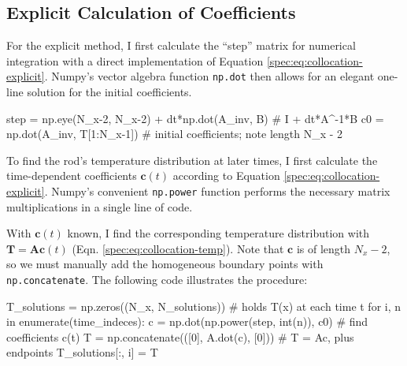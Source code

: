 \documentclass[11pt, a4paper]{article}
\newcommand{\mat}[1]{\mathbf{#1}}
\begin{document}
\subsection{Explicit Calculation of Coefficients}
For the explicit method, I first calculate the ``step'' matrix for numerical integration with a direct implementation of Equation \ref{spec:eq:collocation-explicit}. Numpy's vector algebra function \texttt{np.dot} then allows for an elegant one-line solution for the initial coefficients.
\begin{python}
step = np.eye(N_x-2, N_x-2) + dt*np.dot(A_inv, B)  # I + dt*A^{-1}*B
c0 = np.dot(A_inv, T[1:N_x-1])  # initial coefficients; note length N_x - 2
\end{python}
To find the rod's temperature distribution at later times, I first calculate the time-dependent coefficients $ \bm{c}(t) $ according to Equation \ref{spec:eq:collocation-explicit}. Numpy's convenient \texttt{np.power} function performs the necessary matrix multiplications in a single line of code. 

With $ \bm{c}(t) $ known, I find the corresponding temperature distribution with $ \bm{T} = \mat{A}\bm{c}(t) $ (Eqn. \ref{spec:eq:collocation-temp}). Note that $ \bm{c} $ is of length $ N_{x} -2 $, so we must manually add the homogeneous boundary points with \texttt{np.concatenate}. The following code illustrates the procedure:
\begin{python}
T_solutions = np.zeros((N_x, N_solutions))    # holds T(x) at each time t
for i, n in enumerate(time_indeces):
    c = np.dot(np.power(step, int(n)), c0)    # find coefficients c(t)
    T = np.concatenate(([0], A.dot(c), [0]))  # T = Ac, plus endpoints
    T_solutions[:, i] = T
\end{python}
\end{document}

